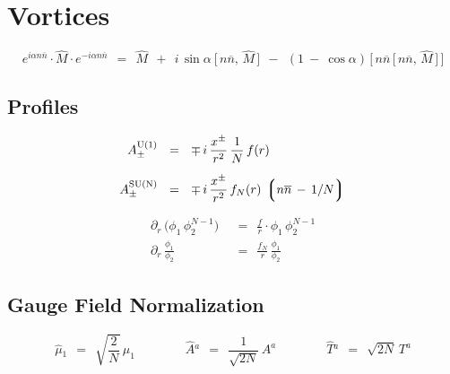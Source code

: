 \documentclass[14pt]{article}
\newcommand{\p}{\partial}
\newcommand{\ov}{\overline}
\newcommand{\lgr}{\left\lgroup}
\newcommand{\rgr}{\right\rgroup}
\newcommand{\nnbar}{n\ov{n}}
\begin{document}
\pagebreak
\section*{\centering Vortices}

\begin{equation*}
e^{i \alpha \nnbar} \cdot \hat{M} \cdot e^{- i \alpha \nnbar}    ~~=~~
\hat{M}  ~~+~~  i\, \sin \alpha \: \big[\, \nnbar,\, \hat{M} \,\big]
~~-~~  ( 1 ~-~ \cos \alpha )\, \big[\, \nnbar\, \big[\, \nnbar,\, \hat{M} \,\big] \,\big]
\end{equation*}


\vspace{2mm}
\subsection*{\centering Profiles}

\begin{align*}
%
	A_\pm^\text{U(1)}    & ~~=~~    \mp\, i\, \frac{x^\pm}{r^2}\, \frac{1}{N}\, f(r)
	\\[2mm]
%
	A_\pm^\text{SU(N)}    & ~~=~~    \mp\, i\, \frac{x^\pm}{r^2}\, f_N(r)\, \lgr \nnbar \,-\, 1/N \rgr
\end{align*}

\begin{align*}
%
	\p_r\, \big( \phi_1\, \phi_2^{N-1} \big)    & ~~=~~    \frac{f}{r} \cdot \phi_1\, \phi_2^{N-1}
	\\[2mm]
%
	\p_r\, \frac{\phi_1}{\phi_2}    & ~~=~~    \frac{f_N}{r}\, \frac{\phi_1}{\phi_2}
\end{align*}


\vspace{2mm}
\subsection*{\centering Gauge Field Normalization}

\begin{equation*}
	\hat{\mu}{}_1    ~~=~~    \sqrt{\frac{2}{N}}\, \mu_1
	\qquad\qquad
	\hat{A}{}^a    ~~=~~    \frac{1}{\sqrt{2 N}}\, A^a
	\qquad\qquad
	\hat{T}{}^a    ~~=~~    \sqrt{2N}\, T^a
\end{equation*}
\end{document}
